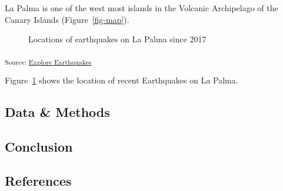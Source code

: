 \documentclass[
]{agujournal2019}
\begin{document}
La Palma is one of the west most islands in the Volcanic Archipelago of
the Canary Islands (Figure~\ref{fig-map}).

\begin{figure}[H]


\caption{\label{fig-spatial-plot}Locations of earthquakes on La Palma
since 2017}

\end{figure}%

\textsubscript{Source:
\href{https://rvcrawford.github.io/glowing-system/notebooks/explore-earthquakes-preview.html\#cell-fig-spatial-plot}{Explore
Earthquakes}}

Figure~\ref{fig-spatial-plot} shows the location of recent Earthquakes
on La Palma.

\subsection{Data \& Methods}\label{sec-data-methods}

\subsection{Conclusion}\label{conclusion}

\subsection*{References}\label{references-1}
\end{document}
